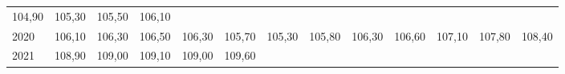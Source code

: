\begin{tabular}{lllllllllllll}
  \multicolumn{1}{r}{104,90} &
  \multicolumn{1}{r}{105,30} &
  \multicolumn{1}{r}{105,50} &
  \multicolumn{1}{r}{106,10} \\
\multicolumn{1}{l}{\hspace{1em}2020} &
  \multicolumn{1}{|r}{106,10} &
  \multicolumn{1}{r}{106,30} &
  \multicolumn{1}{r}{106,50} &
  \multicolumn{1}{r}{106,30} &
  \multicolumn{1}{r}{105,70} &
  \multicolumn{1}{r}{105,30} &
  \multicolumn{1}{r}{105,80} &
  \multicolumn{1}{r}{106,30} &
  \multicolumn{1}{r}{106,60} &
  \multicolumn{1}{r}{107,10} &
  \multicolumn{1}{r}{107,80} &
  \multicolumn{1}{r}{108,40} \\
\multicolumn{1}{l}{\hspace{1em}2021} &
  \multicolumn{1}{|r}{108,90} &
  \multicolumn{1}{r}{109,00} &
  \multicolumn{1}{r}{109,10} &
  \multicolumn{1}{r}{109,00} &
  \multicolumn{1}{r}{109,60} &
  \multicolumn{1}{r}{} &
  \multicolumn{1}{r}{} &
  \multicolumn{1}{r}{} &
  \multicolumn{1}{r}{} &
  \multicolumn{1}{r}{} &
  \multicolumn{1}{r}{} &
  \multicolumn{1}{r}{} \\
\cline{1-13}
\end{tabular}
